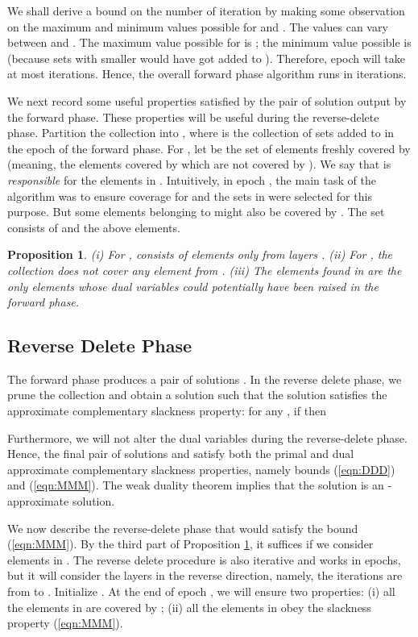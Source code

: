 \documentclass[11pt]{article}
\newtheorem{proposition}[theorem]{\bf Proposition}
\begin{document}
We shall derive a bound on the number of iteration by making some observation on the maximum and minimum values possible
for  and .
The  values can vary between  and .
The maximum value possible for  is ; 
the minimum value possible is  
(because sets with smaller  would have got added to ).
Therefore,  epoch  will take at most 
 iterations.
Hence, the overall forward phase algorithm runs in 
 iterations.

We next record some useful properties satisfied by the pair of solution 
output by the forward phase. These properties will be useful during the reverse-delete phase.
Partition the collection  into , where  is the
collection of sets added to  in the epoch  of the forward phase.
For , let  be the set of elements freshly covered by  (meaning, the elements
covered by  which are not covered by ).
We say that  is {\em responsible} for the elements in .
Intuitively, in epoch , the main task of the algorithm was to ensure coverage for 
and the sets in  were selected for this purpose. But some elements
belonging to  might also be covered by .
The set  consists of  and the above elements.

\begin{proposition}
\label{prop:XXX}
(i) For ,  consists of elements only from layers .
(ii) For , the collection  does not cover any element from .
(iii) The elements found in  are the only elements whose dual variables could 
potentially have been raised in the forward phase.
\end{proposition}

\subsection{Reverse Delete Phase}
The forward phase produces a pair of solutions .
In the reverse delete phase, we prune the collection  and obtain a solution 
such that the solution  satisfies the approximate complementary slackness property: for any , if  then

Furthermore, we will not alter the dual variables during the reverse-delete phase.
Hence, the final pair of solutions  and  satisfy 
both the primal and dual approximate complementary slackness properties, namely bounds (\ref{eqn:DDD}) and
(\ref{eqn:MMM}). The weak duality theorem implies that the solution  is an -approximate solution.

We now describe the reverse-delete phase that would satisfy the bound (\ref{eqn:MMM}).
By the third part of Proposition \ref{prop:XXX},
it suffices if we consider elements in .
The reverse delete procedure is also iterative and works in  epochs, 
but it will consider the layers in the reverse direction,
namely, the iterations are from  to .
Initialize . 
At the end of epoch , we will ensure two properties: 
(i) all the elements in  are covered by ;
(ii) all the elements in  obey  the slackness property (\ref{eqn:MMM}).
\end{document}
